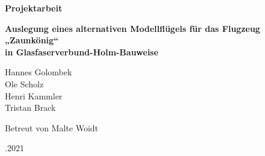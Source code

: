 
\begin{center}
\begin{huge}
	\par\bigskip
	\par\bigskip
	\par\bigskip
	\par\bigskip	
	\par\bigskip
	\par\bigskip	
	\textbf{Projektarbeit}\\
	\par\bigskip
	\par\bigskip	
	\par\bigskip
	\par\bigskip	
	\textbf{Auslegung eines alternativen Modellflügels für das Flugzeug „Zaunkönig“} \\
	\textbf{in Glasfaserverbund-Holm-Bauweise}\\
	\par\bigskip
	\par\bigskip
	
	\end{huge}

	\par\bigskip
\par\bigskip	
\par\bigskip
\par\bigskip
	\par\bigskip
\par\bigskip	
\par\bigskip
\par\bigskip	
	\par\bigskip
\par\bigskip	
\par\bigskip
\par\bigskip	

Hannes Golombek\\
Ole Scholz\\
Henri Kammler\\
Tristan Brack\\
\par\bigskip
\par\bigskip	
\par\bigskip

Betreut von Malte Woidt\\
\par\bigskip
\par\bigskip	
\par\bigskip
\par\bigskip	
\par\bigskip
\par{}.2021\\
\end{center}

